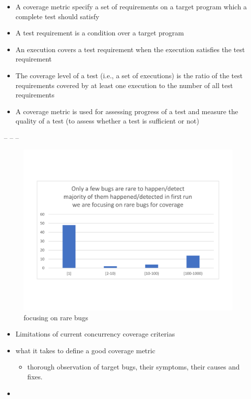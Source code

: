\begin{itemize}
  \item A coverage metric specify a set of requirements on a target program which a complete test should satisfy
  \item A test requirement is a condition over a target
  program
  \item An execution covers a test requirement when the execution satisfies the
  test requirement
  \item The coverage level of a test (i.e., a set of executions) is the ratio of the test requirements covered by at least one execution to the number of all test requirements
  \item A coverage metric is used for assessing progress of a test and measure the quality of a test (to assess whether a test is sufficient or not)
\end{itemize}


–
–
–




\begin{figure}
\centering
  \includegraphics[width=.95\linewidth]{figs/coverage_motivation_tentative.pdf}
  \caption{focusing on rare bugs}
  \label{fig:rare_bugs}
\end{figure}

\begin{itemize}
  \item Limitations of current concurrency coverage criterias
  \item what it takes to define a good coverage metric
  \begin{itemize}
    \item thorough observation of target bugs, their symptoms, their causes and fixes.
  \end{itemize}
  \item
\end{itemize}

